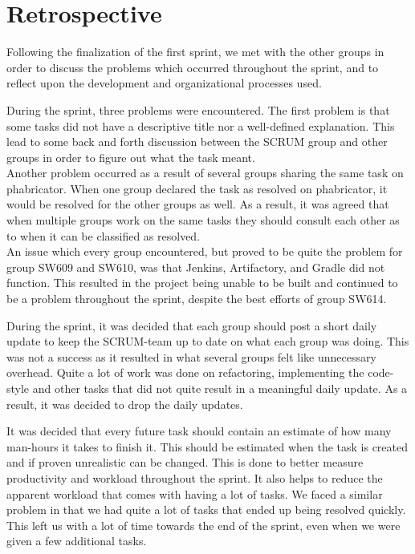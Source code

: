 \section{Retrospective}\label{S1Retro}
Following the finalization of the first sprint, we met with the other
groups in order to discuss the problems which occurred
throughout the sprint, and to reflect upon the development and organizational processes used.\nl

During the sprint, three problems were encountered. The first problem is that
some tasks did not have a descriptive title nor a well-defined explanation.
This lead to some back and forth discussion between the SCRUM group and other
groups in order to figure out what the task meant.\\
Another problem occurred as a result of several groups sharing the same task on
phabricator. When one group declared the task as resolved on phabricator, it
would be resolved for the other groups as well. As a result, it was agreed that
when multiple groups work on the same tasks they should consult each other as to
when it can be classified as resolved.\\
An issue which every group encountered, but proved to be quite the problem for
group SW609 and SW610, was that Jenkins, Artifactory, and Gradle did not
function.
This resulted in the project being unable to be built and continued to be a
problem throughout the sprint, despite the best efforts of group SW614.\nl

During the sprint, it was decided that each group should post a short daily
update to keep the SCRUM-team up to date on what each group was doing. This was
not a success as it resulted in what several groups felt like unnecessary
overhead. Quite a lot of work was done on refactoring, implementing the
code-style and other tasks that did not quite result in a meaningful daily
update. As a result, it was decided to drop the daily updates.\nl

It was decided that every future task should contain an estimate of how many
man-hours it takes to finish it. This should be estimated when the
task is created and if proven unrealistic can be changed. This is done to
better measure productivity and workload throughout the sprint. It also helps
to reduce the apparent workload that comes with having a lot of tasks. We faced a
similar problem in that we had quite a lot of tasks that ended up being resolved
quickly. This left us with a lot of time towards the end of the sprint, even when we
were given a few additional tasks.

